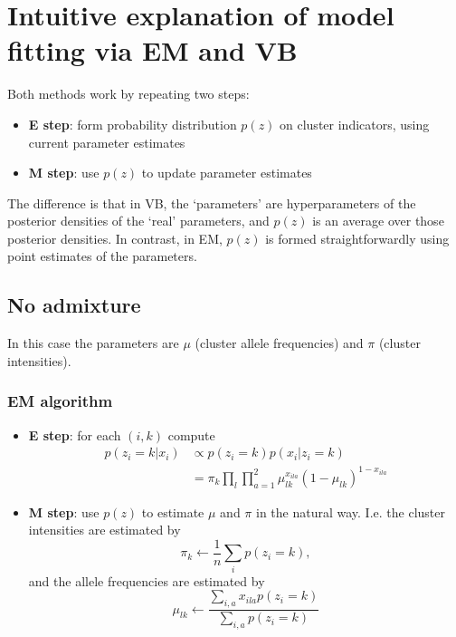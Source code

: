 \documentclass[12pt,a4paper,reqno]{article}
\newcommand{\(}{\left(}
\newcommand{\)}{\right)}
\newcommand{\|}{\arrowvert}
\begin{document}
\section{Intuitive explanation of model fitting via EM and VB}

Both methods work by repeating two steps:
\begin{itemize}
\item \textbf{E step}: form probability distribution $p(z)$ on cluster indicators, using current parameter estimates
\item \textbf{M step}: use $p(z)$ to update parameter estimates
\end{itemize}
The difference is that in VB, the `parameters' are hyperparameters of the posterior densities of the `real' parameters, and $p(z)$ is an average over those posterior densities. In contrast, in EM, $p(z)$ is formed straightforwardly using point estimates of the parameters.
  
\subsection{No admixture}
In this case the parameters are $\mu$ (cluster allele frequencies) and $\pi$ (cluster intensities).

\subsubsection{EM algorithm}

\begin{itemize}
\item \textbf{E step}: for each $(i,k)$ compute 
\begin{align*}
  p(z_{i} = k| x_{i}) &\propto p(z_{i}=k)p(x_{i}|z_{i}=k) \\
          &= \pi_{k}\prod_{l}\prod_{a=1}^{2}\mu_{lk}^{x_{ila}}(1-\mu_{lk})^{1-x_{ila}}
\end{align*}
\item \textbf{M step}: use $p(z)$ to estimate $\mu$ and $\pi$ in the natural way. I.e. the cluster intensities are estimated by 
\[
\pi_{k} \leftarrow \frac{1}{n}\sum_{i}p(z_{i}=k),
\]
 and the allele frequencies are estimated by
\[
\mu_{lk} \leftarrow \frac{\sum_{i,a}x_{ila}p(z_{i}=k)}{\sum_{i,a}p(z_{i}=k)}
\]
\end{itemize}
\end{document}
